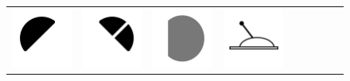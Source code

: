 \documentclass[doc]{apa6}
\newcommand{\stimulusscale}{.1}
\begin{document}
\begin{figure}[t]
\begin{center}
\begin{tabular}{c|cccccccc}
\includegraphics[scale=\stimulusscale]{./set31stim55.png} &
\includegraphics[scale=\stimulusscale]{./set32stim55.png} &
\includegraphics[scale=\stimulusscale]{./set33stim55.png} &
\includegraphics[scale=\stimulusscale]{./set34stim55.png} &

\end{tabular}
\end{center}
\end{figure}
\end{document}

